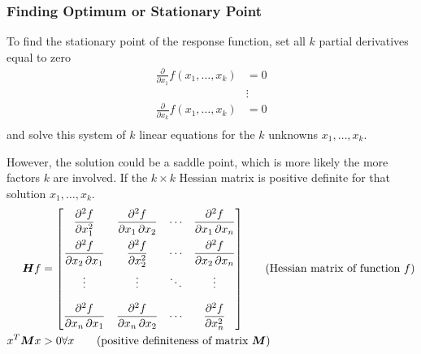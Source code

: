 \documentclass[11pt]{article}
\theoremstyle{definition}
\begin{document}
\subsubsection{Finding Optimum or Stationary Point}
To find the stationary point of the response function, set all $k$ partial derivatives equal to zero
\begin{align*}
	\frac{\partial}{\partial x_1}f(x_1,\dots,x_k) &= 0\\
	&\vdots\\
	\frac{\partial}{\partial x_k}f(x_1,\dots,x_k) &= 0\\
\end{align*}
and solve this system of $k$ linear equations for the $k$ unknowns $x_1,\dots,x_k$.

However, the solution could be a saddle point, which is more likely the more factors $k$ are involved. If the $k\times k$ Hessian matrix is positive definite for that solution $x_1,\dots,x_k$.
\begin{align*}
	\bm{H} f &= {\begin{bmatrix}{\dfrac {\partial ^{2}f}{\partial x_{1}^{2}}}&{\dfrac {\partial ^{2}f}{\partial x_{1}\,\partial x_{2}}}&\cdots &{\dfrac {\partial ^{2}f}{\partial x_{1}\,\partial x_{n}}}\\[2.2ex]{\dfrac {\partial ^{2}f}{\partial x_{2}\,\partial x_{1}}}&{\dfrac {\partial ^{2}f}{\partial x_{2}^{2}}}&\cdots &{\dfrac {\partial ^{2}f}{\partial x_{2}\,\partial x_{n}}}\\[2.2ex]\vdots &\vdots &\ddots &\vdots \\[2.2ex]{\dfrac {\partial ^{2}f}{\partial x_{n}\,\partial x_{1}}}&{\dfrac {\partial ^{2}f}{\partial x_{n}\,\partial x_{2}}}&\cdots &{\dfrac {\partial ^{2}f}{\partial x_{n}^{2}}}\end{bmatrix}} \tag{Hessian matrix of function $f$}\\
	x^T\bm{M}x &> 0 \forall x \tag{positive definiteness of matrix $\bm{M}$}
\end{align*}
\end{document}
